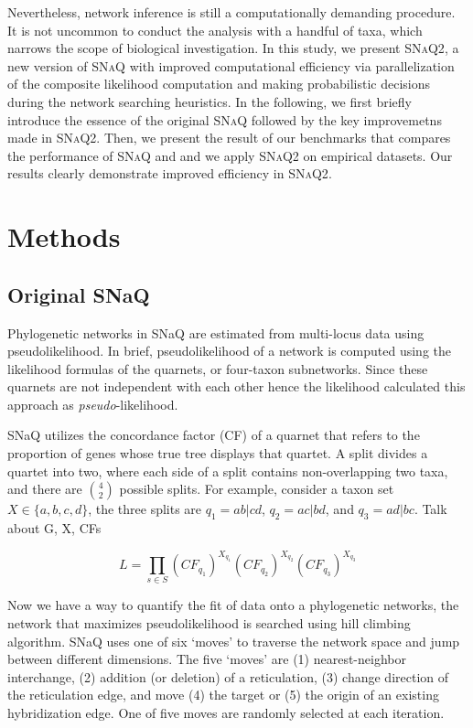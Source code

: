 \documentclass[unnumsec,webpdf,contemporary,large]{oup-authoring-template}%
\theoremstyle{thmstyleone}%
\theoremstyle{thmstyletwo}%
\theoremstyle{thmstylethree}%
\begin{document}
Nevertheless, network inference is still a computationally demanding procedure. It is not uncommon to conduct the analysis with a handful of taxa, which narrows the scope of biological investigation. In this study, we present \textsc{SNaQ2}, a new version of \textsc{SNaQ} with improved computational efficiency via parallelization of the composite likelihood computation and making probabilistic decisions during the network searching heuristics. In the following, we first briefly introduce the essence of the original \textsc{SNaQ} followed by the key improvemetns made in \textsc{SNaQ2}. Then, we present the result of our benchmarks that compares the performance of \textsc{SNaQ} and  and we apply \textsc{SNaQ2} on empirical datasets. Our results clearly demonstrate improved efficiency in \textsc{SNaQ2}.

\section{Methods}\label{sec2}
\subsection{Original SNaQ}\label{subsec1}
Phylogenetic networks in SNaQ are estimated from multi-locus data using pseudolikelihood. In brief, pseudolikelihood of a network is computed using the likelihood formulas of the quarnets, or four-taxon subnetworks. Since these quarnets are not independent with each other hence the likelihood calculated this approach as \textit{pseudo}-likelihood.

SNaQ utilizes the concordance factor (CF) of a quarnet that refers to the proportion of genes whose true tree displays that quartet. A split divides a quartet into two, where each side of a split contains non-overlapping two taxa, and there are $4 \choose 2$ possible splits. For example, consider a taxon set $X \in \{a,b,c,d\}$, the three splits are $q_1=ab|cd$, $q_2=ac|bd$, and $q_3=ad|bc$. Talk about G, X, CFs

\begin{equation}
    L=\prod_{s \in S}(CF_{q_1})^{X_{q_1}}(CF_{q_2})^{X_{q_2}}(CF_{q_3})^{X_{q_3}}
\end{equation}

Now we have a way to quantify the fit of data onto a phylogenetic networks, the network that maximizes pseudolikelihood is searched using hill climbing algorithm. SNaQ uses one of six `moves' to traverse the network space and jump between different dimensions. The five `moves' are (1) nearest-neighbor interchange, (2) addition (or deletion) of a reticulation, (3) change direction of the reticulation edge, and move (4) the target or (5) the origin of an existing hybridization edge. One of five moves are randomly selected at each iteration.
\end{document}
